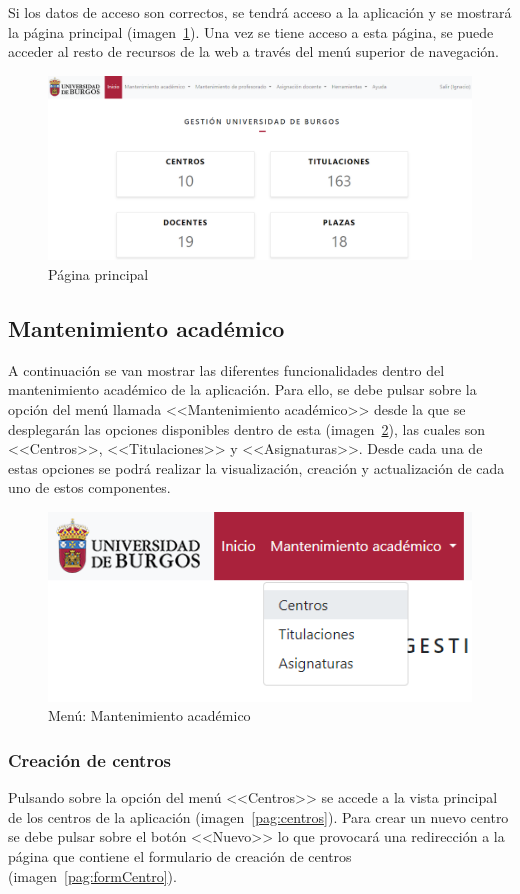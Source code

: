 Si los datos de acceso son correctos, se tendrá acceso a la aplicación y se mostrará la página principal (imagen~\ref{pag:inicio}).
Una vez se tiene acceso a esta página, se puede acceder al resto de recursos de la web a través del menú superior de navegación.

\begin{figure}
	\centering
	\includegraphics[width=\textwidth]{../img/Anexos/Manual usuario/inicio.png}
	\caption{Página principal}\label{pag:inicio}
\end{figure}

\subsection{Mantenimiento académico}
A continuación se van mostrar las diferentes funcionalidades dentro del mantenimiento académico de la aplicación.
Para ello, se debe pulsar sobre la opción del menú llamada <<Mantenimiento académico>> desde la que se desplegarán las opciones disponibles dentro de esta (imagen~\ref{pag:menuManAc}), las cuales son <<Centros>>, <<Titulaciones>> y <<Asignaturas>>.
Desde cada una de estas opciones se podrá realizar la visualización, creación y actualización de cada uno de estos componentes.

\begin{figure}
	\centering
	\includegraphics[width=.6\textwidth]{../img/Anexos/Manual usuario/menu man ac.png}
	\caption{Menú: Mantenimiento académico}\label{pag:menuManAc}
\end{figure}

\subsubsection{Creación de centros}
Pulsando sobre la opción del menú <<Centros>> se accede a la vista principal de los centros de la aplicación (imagen~\ref{pag:centros}).
Para crear un nuevo centro se debe pulsar sobre el botón <<Nuevo>> lo que provocará una redirección a la página que contiene el formulario de creación de centros (imagen~\ref{pag:formCentro}).

